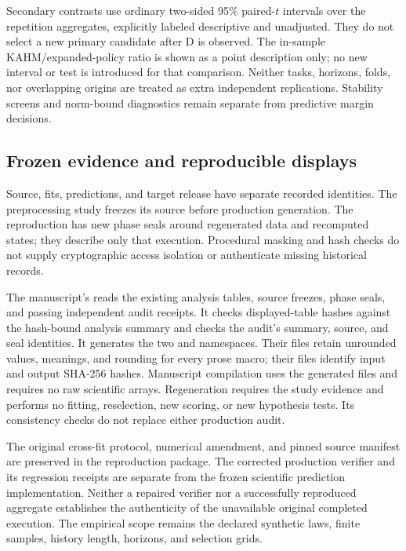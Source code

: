 Secondary contrasts use ordinary two-sided 95\% paired-$t$ intervals over
the repetition aggregates, explicitly labeled descriptive and unadjusted.
They do not select a new primary candidate after D is observed. The
in-sample KAHM/expanded-policy ratio is shown as a point description only;
no new interval or test is introduced for that comparison. Neither tasks,
horizons, folds, nor overlapping origins are treated as extra independent
replications. Stability screens and norm-bound diagnostics remain separate
from predictive margin decisions.

\subsection{Frozen evidence and reproducible displays}

Source, fits, predictions, and target release have separate recorded
identities. The preprocessing study freezes its source before production
generation. The reproduction has new phase seals around regenerated data
and recomputed states; they describe only that execution. Procedural
masking and hash checks do not supply cryptographic access isolation or
authenticate missing historical records.

The manuscript's  reads the existing
analysis tables, source freezes, phase seals, and passing independent audit
receipts. It checks displayed-table hashes against the hash-bound analysis
summary and checks the audit's summary, source, and seal identities.
It generates the two  and
 namespaces. Their
 files retain unrounded values, meanings, and rounding
for every prose macro; their  files identify
input and output SHA-256 hashes. Manuscript compilation uses the generated
files and requires no raw scientific arrays. Regeneration requires the
study evidence and performs no fitting, reselection, new scoring, or new
hypothesis tests. Its consistency checks do not replace either production
audit.

The original cross-fit protocol, numerical amendment, and pinned source
manifest are preserved in the reproduction package. The corrected
production verifier and its regression receipts are separate from the
frozen scientific prediction implementation. Neither a repaired verifier
nor a successfully reproduced aggregate establishes the authenticity of
the unavailable original completed execution. The empirical scope remains
the declared synthetic laws, finite samples, history length, horizons, and
selection grids.

